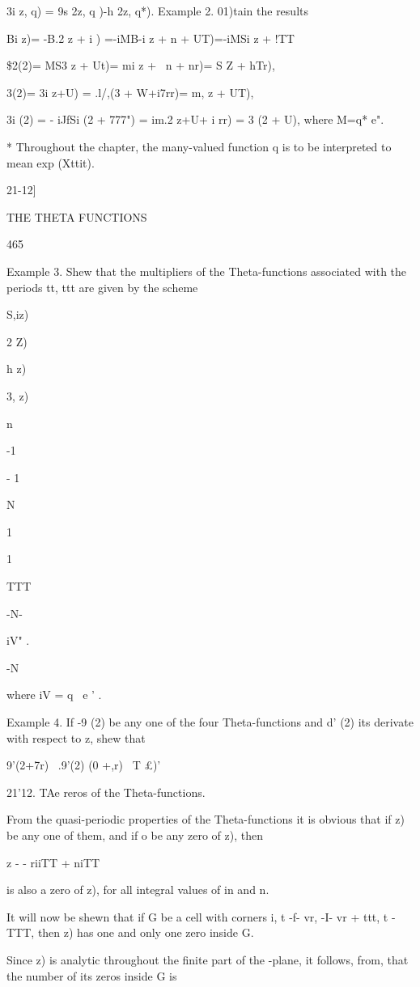 3i z, q) = 9s 2z, q )-h 2z, q*). Example 2. 01)tain the results

Bi z)= -B.2 z + i ) =-iMB-i z + n + UT)=-iMSi z + !TT\

\$2(2)= MS3 z + Ut)= mi z + \ n + nr)= S Z + hTr),

 3(2)= 3i z+U) = .l/,(3 + W+i7rr)= m, z + UT),

3i (2) = - iJfSi (2 + 777") = im.2 z+U+ i rr) = 3 (2 + U), where M=q*
e".

* Throughout the chapter, the many-valued function q is to be
interpreted to mean exp (Xttit).

21-12]

THE THETA FUNCTIONS

465

Example 3. Shew that the multipliers of the Theta-functions associated
with the periods tt, ttt are given by the scheme

S,iz)

 2 Z)

h z)

3, z)

n

-1

- 1

N

1

1

TTT

-N-

iV" .

-N

where iV = q~ e ' .

Example 4. If -9 (2) be any one of the four Theta-functions and d' (2)
its derivate with respect to z, shew that

 9'(2+7r) \ .9'(2) (0 +,r) ~T £)'

21'12. TAe reros of the Theta-functions.

From the quasi-periodic properties of the Theta-functions it is
obvious that if z) be any one of them, and if o be any zero of z),
then

z - - riiTT + niTT

is also a zero of z), for all integral values of in and n.

It will now be shewn that if G be a cell with corners i, t -f- vr, -I-
vr + ttt, t - TTT, then z) has one and only one zero inside G.

Since z) is analytic throughout the finite part of the -plane, it
follows, from, that the number of its zeros inside G is

